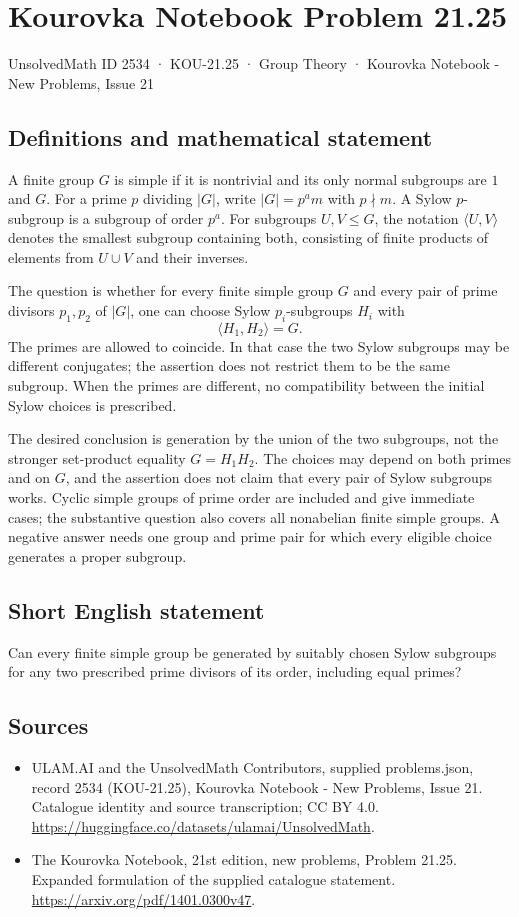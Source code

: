 \documentclass[11pt,a4paper]{article}
\begin{document}
\section*{Kourovka Notebook Problem 21.25}\label{2534}
{\small UnsolvedMath ID 2534 · KOU-21.25 · Group Theory · Kourovka Notebook - New Problems, Issue 21}
\subsection{Definitions and mathematical statement}
A finite group $G$ is simple if it is nontrivial and its only normal
subgroups are $1$ and $G$. For a prime $p$ dividing $|G|$, write
$|G|=p^a m$ with $p\nmid m$. A Sylow $p$-subgroup is a subgroup of
order $p^a$. For subgroups $U,V\le G$, the notation $\langle U,V\rangle$
denotes the smallest subgroup containing both, consisting of finite
products of elements from $U\cup V$ and their inverses.

The question is whether for every finite simple group $G$ and every
pair of prime divisors $p_1,p_2$ of $|G|$, one can choose Sylow
$p_i$-subgroups $H_i$ with
\[
 \langle H_1,H_2\rangle=G.
\]
The primes are allowed to coincide. In that case the two Sylow subgroups
may be different conjugates; the assertion does not restrict them to be
the same subgroup. When the primes are different, no compatibility
between the initial Sylow choices is prescribed.

The desired conclusion is generation by the union of the two subgroups,
not the stronger set-product equality $G=H_1H_2$. The choices may depend
on both primes and on $G$, and the assertion does not claim that every
pair of Sylow subgroups works. Cyclic simple groups of prime order are
included and give immediate cases; the substantive question also covers
all nonabelian finite simple groups. A negative answer needs one group
and prime pair for which every eligible choice generates a proper subgroup.
\subsection{Short English statement}
Can every finite simple group be generated by suitably chosen Sylow subgroups for any two prescribed prime divisors of its order, including equal primes?
\subsection{Sources}
\begin{itemize}
\item[S1] ULAM.AI and the UnsolvedMath Contributors, supplied problems.json, record 2534 (KOU-21.25), Kourovka Notebook - New Problems, Issue 21. Catalogue identity and source transcription; CC BY 4.0.
\url{https://huggingface.co/datasets/ulamai/UnsolvedMath}.
\item[S2] The Kourovka Notebook, 21st edition, new problems, Problem 21.25. Expanded formulation of the supplied catalogue statement.
\url{https://arxiv.org/pdf/1401.0300v47}.
\end{itemize}
\end{document}
